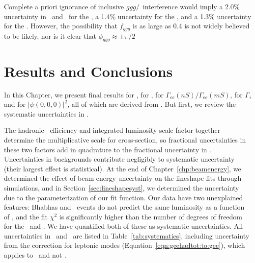 \documentclass{cornell}
\begin{document}
Complete a priori ignorance of inclusive $ggg$/\qqbar\ interference
would imply a 2.0\% uncertainty in \geehadtot\ and \gee\ for the \us,
a 1.4\% uncertainty for the \uss, and a 1.3\% uncertainty for the
\usss.  However, the possibility that $f_{ggg}$ is as large as 0.4 is
not widely believed to be likely, nor is it clear that $\phi_{ggg}
\approx \pm\pi/2$

\chapter{Results and Conclusions}
\label{chp:results}

In this Chapter, we present final results for \geehadtot, for \gee,
for $\Gamma_{ee}(nS)/\Gamma_{ee}(mS)$, for $\Gamma$, and for
$|\psi(0,0,0)|^2$, all of which are derived from \geehadtot.  But
first, we review the systematic uncertainties in \geehadtot.

The hadronic \ups\ efficiency and integrated luminosity scale factor
together determine the multiplicative scale for cross-section, so
fractional uncertainties in these two factors add in quadrature to the
fractional uncertainty in \geehadtot.  Uncertainties in backgrounds
contribute negligibly to systematic uncertainty (their largest effect
is statistical).  At the end of Chapter~\ref{chp:beamenergy}, we
determined the effect of beam energy uncertainty on the lineshape fits
through simulations, and in Section~\ref{sec:lineshapesyst}, we
determined the uncertainty due to the parameterization of our fit
function.  Our data have two unexplained features: Bhabhas and
\gamgam\ events do not predict the same luminosity as a function of
\ecm, and the fit $\chi^2$ is significantly higher than the number of
degrees of freedom for the \us\ and \uss.  We have quantified both of
these as systematic uncertainties.  All uncertainties in \geehadtot\
and \gee\ are listed in Table~\ref{tab:systematics}, including
uncertainty from the correction for leptonic modes
(Equation~\ref{eqn:geehadtot:to:gee}), which applies to \gee\ and not
\geehadtot.
\end{document}

